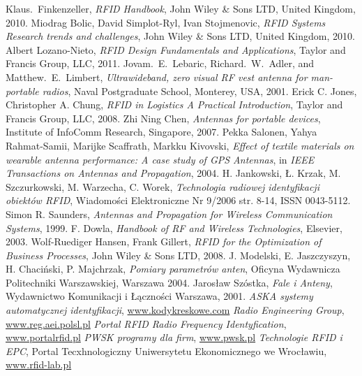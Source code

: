 \begin{thebibliography}{99}
%
Klaus.~Finkenzeller, \emph{RFID Handbook}, John Wiley \& Sons LTD, United Kingdom, 2010.
%
Miodrag Bolic, David Simplot-Ryl, Ivan Stojmenovic, \emph{RFID Systems Research trends and challenges}, John Wiley \& Sons LTD, United Kingdom, 2010.
%
Albert Lozano-Nieto, \emph{RFID Design Fundamentals and Applications}, Taylor and Francis Group, LLC, 2011.
%
Jovam.~E.~Lebaric, Richard.~W.~Adler, and Matthew.~E.~Limbert, \emph{Ultrawideband, zero visual RF vest antenna for man-portable radios}, Naval Postgraduate School, Monterey, USA, 2001. 
%
Erick C. Jones, Christopher A. Chung, \emph{RFID in Logistics A Practical Introduction}, Taylor and Francis Group, LLC, 2008. 
%
Zhi Ning Chen, \emph{Antennas for portable devices}, Institute of InfoComm Research, Singapore, 2007.
%
Pekka Salonen, Yahya Rahmat-Samii, Marijke Scaffrath, Markku Kivovski, \emph{Effect of textile materials on wearable antenna performance: A case study of GPS Antennas}, in \emph{IEEE Transactions on Antennas and Propagation}, 2004.
%
H. Jankowski, Ł. Krzak, M. Szczurkowski, M. Warzecha, C. Worek, \emph{Technologia radiowej identyfikacji obiektów RFID}, Wiadomości Elektroniczne Nr 9/2006 str. 8-14, ISSN 0043-5112.
%
Simon R. Saunders, \emph{Antennas and Propagation for Wireless Communication Systems}, 1999. 
%
F. Dowla, \emph{Handbook of RF and Wireless Technologies}, Elsevier, 2003.
%
Wolf-Ruediger Hansen, Frank Gillert, \emph{RFID for the Optimization of Business Processes}, John Wiley \& Sons LTD, 2008.
%
J. Modelski, E. Jaszczyszyn, H. Chaciński, P. Majchrzak, \emph{Pomiary parametrów anten}, Oficyna Wydawnicza Politechniki Warszawskiej, Warszawa 2004.  
%
Jarosław Szóstka, \emph{Fale i Anteny}, Wydawnictwo Komunikacji i Łączności Warszawa, 
2001.
%
\emph{ASKA systemy automatycznej identyfikacji}, \url{www.kodykreskowe.com}
%
\emph{Radio Engineering Group}, \url{www.reg.aei.polsl.pl}
%
\emph{Portal RFID Radio Frequency Identyfication}, \url{www.portalrfid.pl}
%
\emph{PWSK programy dla firm}, \url{www.pwsk.pl}
%
\emph{Technologie RFID i EPC}, Portal Tecxhnologiczny Uniwersytetu Ekonomicznego we Wrocławiu, \url{www.rfid-lab.pl}
\end{thebibliography}
